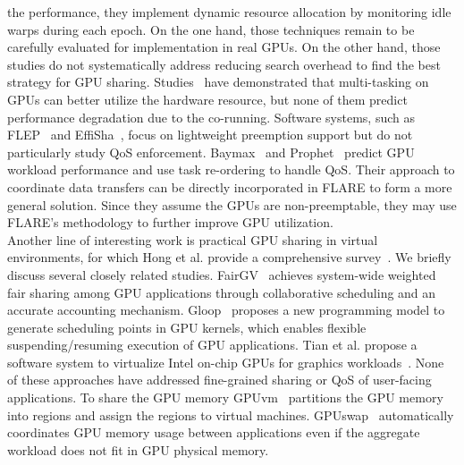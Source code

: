 the performance, they implement dynamic resource allocation by monitoring idle warps during each epoch. %
On the one hand, those techniques remain to be
carefully evaluated for implementation in real GPUs. On the other hand, those studies do
not systematically address reducing search overhead to find the best strategy for GPU sharing. 
Studies~\cite{Liang:TPDS15} have demonstrated 
that multi-tasking on GPUs can better utilize the hardware resource, 
but none of them predict performance degradation due to the co-running. 
Software systems, such as FLEP~\cite{Wu:ASPLOS2017} and EffiSha~\cite{Chen:PPoPP2017},
focus on lightweight preemption support but do not particularly study QoS enforcement.
Baymax~\cite{Chen+:ASPLOS16} and Prophet~\cite{Chen:ASPLOS2017} predict GPU workload
performance and use task re-ordering to handle QoS. 
Their approach to coordinate data transfers can be directly incorporated in 
FLARE to form a more general solution. Since they assume the GPUs are non-preemptable, %
they may use FLARE's methodology to further improve GPU utilization.\\
Another line of interesting work is practical GPU sharing in virtual environments, 
for which Hong et al. provide a comprehensive survey~\cite{Hong:ACSU}. 
We briefly discuss several closely related studies. FairGV~\cite{Hong:TPDS17} 
achieves system-wide weighted fair sharing among GPU applications through 
collaborative scheduling and an accurate accounting mechanism. 
Gloop~\cite{Suzuki:SOCC17} proposes a new programming model to generate scheduling points in GPU kernels, 
which enables flexible suspending/resuming execution of GPU applications. 
Tian et al. propose a software system to virtualize Intel on-chip GPUs for graphics workloads~\cite{Tian+:ATC14}. 
None of these approaches have addressed fine-grained sharing or QoS of user-facing applications. 
To share the GPU memory %
GPUvm~\cite{Suzuki+:ATC14} partitions 
the GPU memory into regions and assign the regions to virtual machines. 
GPUswap~\cite{Kehne+:VEE15} automatically coordinates GPU memory usage between applications 
even if the aggregate workload does not fit in GPU physical memory. 

